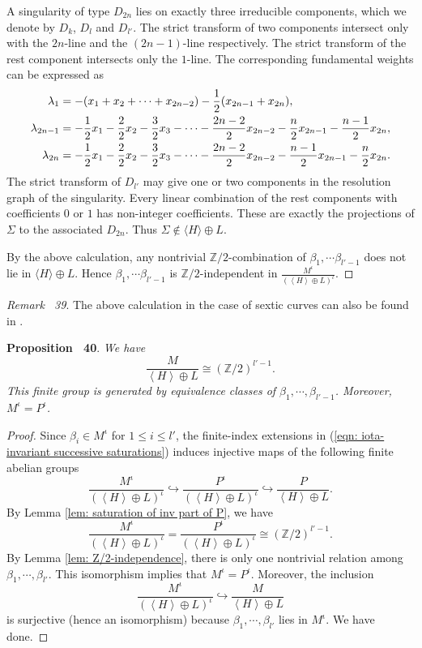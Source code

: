 \documentclass[
]{article}
\begin{document}
A singularity of type \(D_{2n}\) lies on exactly three irreducible
components, which we denote by \(D_k\), \(D_l\) and \(D_{l'}\). The
strict transform of two components intersect only with the \(2n\)-line
and the \((2n-1)\)-line respectively. The strict transform of the rest
component intersects only the \(1\)-line. The corresponding fundamental
weights can be expressed as \[\begin{aligned}
    \lambda_1 &= -(x_1+x_2+\cdots+x_{2n-2})-{1\over 2}(x_{2n-1}+x_{2n}), \\
    \lambda_{2n-1} &= -{1\over 2}x_1 - {2\over 2}x_2 - {3\over 2}x_3 - \cdots - {2n-2\over 2}x_{2n-2} - {n\over 2}x_{2n-1} - {n-1\over 2}x_{2n}, \\
    \lambda_{2n} &= -{1\over 2}x_1 - {2\over 2}x_2 - {3\over 2}x_3 - \cdots - {2n-2\over 2}x_{2n-2} - {n-1\over 2}x_{2n-1} - {n\over 2}x_{2n}. \\
\end{aligned}\] The strict transform of \(D_{l'}\) may give one or two
components in the resolution graph of the singularity. Every linear
combination of the rest components with coefficients \(0\) or \(1\) has
non-integer coefficients. These are exactly the projections of
\(\Sigma\) to the associated \(D_{2n}\). Thus
\(\Sigma\notin \langle H\rangle\oplus L\).

By the above calculation, any nontrivial \(\mathbb{Z}/2\)-combination of
\(\beta_1,\cdots\beta_{l'-1}\) does not lie in
\(\langle H\rangle\oplus L\). Hence \(\beta_1,\cdots\beta_{l'-1}\) is
\(\mathbb{Z}/2\)-independent in
\(\frac{M^{\iota}}{(\left\langle H \right\rangle\oplus L)^{\iota}}\).~◻

\emph{Remark~ 39}. The above calculation in the case of sextic curves
can also be found in \cite[\S 3, Tabel 1]{yang1996sextic}.

\textbf{Proposition~ 40}. \emph{\label{prop: saturation of M_F} We have
\[\frac{M}{\left\langle H\right\rangle \oplus L}\cong (\mathbb{Z}/2)^{l'-1}.\]
This finite group is generated by equivalence classes of
\(\beta_1,\cdots, \beta_{l'-1}\). Moreover, \(M^{\iota} = P^{\iota}\).}

\emph{Proof.} Since \(\beta_i \in M^{\iota}\) for \(1\le i\le l'\), the
finite-index extensions in
(\ref{eqn: iota-invariant successive saturations}) induces injective
maps of the following finite abelian groups
\[\frac{M^{\iota}}{(\left\langle H \right\rangle\oplus L)^{\iota}} \hookrightarrow \frac{P^{\iota}}{(\left\langle H \right\rangle\oplus L)^{\iota}} \hookrightarrow \frac{P}{\left\langle H \right\rangle\oplus L}.\]
By Lemma \ref{lem: saturation of inv part of P}, we have
\[\frac{M^{\iota}}{(\left\langle H \right\rangle\oplus L)^{\iota}} = \frac{P^{\iota}}{(\left\langle H \right\rangle\oplus L)^{\iota}} \cong (\mathbb{Z}/2)^{l'-1}.\]
By Lemma \ref{lem: Z/2-independence}, there is only one nontrivial
relation among \(\beta_1, \cdots, \beta_{l'}\). This isomorphism implies
that \(M^{\iota} = P^{\iota}\). Moreover, the inclusion
\[\frac{M^{\iota}}{(\left\langle H \right\rangle\oplus L)^{\iota}} \hookrightarrow \frac{M}{\left\langle H \right\rangle\oplus L}\]
is surjective (hence an isomorphism) because
\(\beta_1, \cdots, \beta_{l'}\) lies in \(M^\iota\). We have done.~◻
\end{document}
